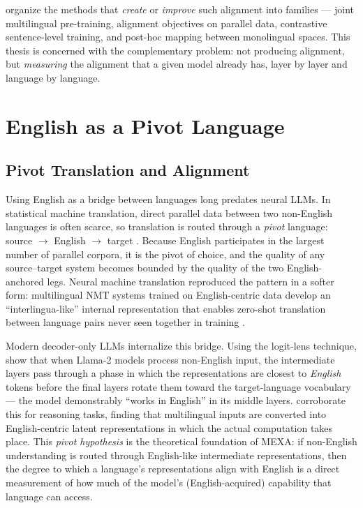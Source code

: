 \citet{hammerl2024survey} organize the methods that \emph{create} or
\emph{improve} such alignment into families --- joint multilingual
pre-training, alignment objectives on parallel data, contrastive
sentence-level training, and post-hoc mapping between monolingual spaces.
This thesis is concerned with the complementary problem: not producing
alignment, but \emph{measuring} the alignment that a given model already
has, layer by layer and language by language.

\section{English as a Pivot Language}
\label{sec:english-pivot}

\subsection{Pivot Translation and Alignment}
\label{subsec:pivot-translation}

Using English as a bridge between languages long predates neural LLMs. In
statistical machine translation, direct parallel data between two
non-English languages is often scarce, so translation is routed through a
\emph{pivot} language: source $\rightarrow$ English $\rightarrow$ target
\citep{wu2007pivot}. Because English participates in the largest number of
parallel corpora, it is the pivot of choice, and the quality of any
source--target system becomes bounded by the quality of the two
English-anchored legs. Neural machine translation reproduced the pattern
in a softer form: multilingual NMT systems trained on English-centric data
develop an ``interlingua-like'' internal representation that enables
zero-shot translation between language pairs never seen together in
training \citep{johnson2017zeroshot}.

Modern decoder-only LLMs internalize this bridge. Using the logit-lens
technique, \citet{wendler2024llamas} show that when Llama-2 models process
non-English input, the intermediate layers pass through a phase in which
the representations are closest to \emph{English} tokens before the final
layers rotate them toward the target-language vocabulary --- the model
demonstrably ``works in English'' in its middle layers.
\citet{zhao2024multilingualism} corroborate this for reasoning tasks,
finding that multilingual inputs are converted into English-centric latent
representations in which the actual computation takes place. This
\emph{pivot hypothesis} is the theoretical foundation of MEXA: if
non-English understanding is routed through English-like intermediate
representations, then the degree to which a language's representations
align with English is a direct measurement of how much of the model's
(English-acquired) capability that language can access.

